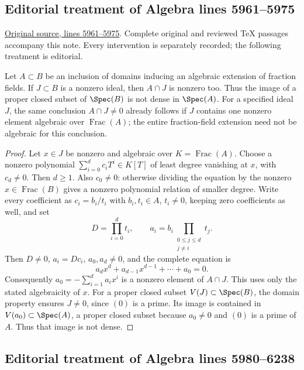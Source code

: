 \subsection{Editorial treatment of Algebra lines 5961--5975}

\hypertarget{algebra-context-043}{}

\noindent\href{https://github.com/stacks/stacks-project/blob/a04446e57ec1fbc252a871afcec7752fb2807b14/algebra.tex\#L5961}{Original source, lines 5961--5975}. Complete original and reviewed TeX passages accompany this note. Every intervention is separately recorded; the following treatment is editorial.


\begin{lemma}
\label{editorial-source-lemma-intersection-not-zero}
Let $A \subset B$ be an inclusion of domains inducing an algebraic extension
of fraction fields. If $J \subset B$ is a nonzero ideal, then $A \cap J$
is nonzero too. Thus the image of a proper closed subset of $\Spec(B)$
is not dense in $\Spec(A)$.
For a specified ideal $J$, the same conclusion $A\cap J\ne0$ already
follows if $J$ contains one nonzero element algebraic over
$\operatorname{Frac}(A)$; the entire fraction-field extension need
not be algebraic for this conclusion.
\end{lemma}

\begin{proof}
Let $x\in J$ be nonzero and algebraic over $K=\operatorname{Frac}(A)$.
Choose a nonzero polynomial $\sum_{i=0}^dc_iT^i\in K[T]$ of least
degree vanishing at $x$, with $c_d\ne0$. Then $d\geq1$.
Also $c_0\ne0$: otherwise dividing the equation by the nonzero
$x\in\operatorname{Frac}(B)$ gives a nonzero polynomial relation
of smaller degree. Write every coefficient as $c_i=b_i/t_i$ with
$b_i,t_i\in A$, $t_i\ne0$, keeping zero coefficients as well, and set
$$
D=\prod_{i=0}^dt_i,\qquad
a_i=b_i\prod_{\substack{0\leq j\leq d\\j\ne i}}t_j.
$$
Then $D\ne0$, $a_i=Dc_i$, $a_0,a_d\ne0$, and the complete equation is
$$
a_dx^d+a_{d-1}x^{d-1}+\cdots+a_0=0.
$$
Consequently $a_0=-\sum_{i=1}^d a_ix^i$ is a nonzero element of
$A\cap J$. This uses only the stated algebraicity of $x$.
For a proper closed subset $V(J)\subset\Spec(B)$, the domain property
ensures $J\ne0$, since $(0)$ is a prime. Its image is contained in
$V(a_0)\subset\Spec(A)$, a proper closed subset because
$a_0\ne0$ and $(0)$ is a prime of $A$. Thus that image is not dense.
\end{proof}


\subsection{Editorial treatment of Algebra lines 5980--6238}

